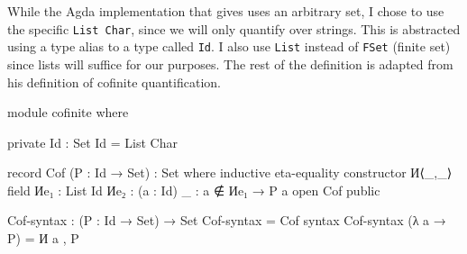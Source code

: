 While the Agda implementation that \citet{pitts_locally_2023} gives uses an arbitrary set, I chose
to use the specific \texttt{List Char}, since we will only quantify over strings. This is abstracted
using a type alias to a type called \texttt{Id}. I also use \texttt{List} instead of \texttt{FSet}
(finite set) since lists will suffice for our purposes. The rest of the definition is adapted from
his definition of cofinite quantification.
\begin{code}
module cofinite where
\end{code}
\begin{comment}
\begin{code}
  -- Data types (naturals, strings, characters)
  open import Data.Nat using (ℕ; zero; suc; _≤_; z≤n; s≤s)
  open import Data.Nat.Properties using (≤-refl; ≤-trans; ≤-antisym; ≤-total)
  open import Data.Char using (Char)
  open import Data.Char.Properties using () renaming (_≟_ to _≟char_)

  -- Relations and predicates/decidability.
  import Relation.Binary.PropositionalEquality as Eq
  open Eq using (_≡_; _≢_; refl; sym; trans; cong)
  open import Relation.Binary.Definitions using (DecidableEquality)
  open import Relation.Nullary.Decidable using (Dec)
  open import Relation.Unary using (Decidable)
  open import Relation.Binary using () renaming (Decidable to BinaryDecidable)
  open import Relation.Nullary.Negation using (contradiction)

  -- Lists.
  open import Data.List using (List; []; _∷_; _++_; length; filter; map; foldr; head; replicate)
  open import Data.List.Properties using (≡-dec)
  import Data.List.Membership.DecPropositional as DecPropMembership
  open import Data.List.Relation.Unary.All using (All; all?; lookup)
    renaming (fromList to All-fromList; toList to All-toList)
  open import Data.List.Relation.Unary.Any using (Any; here; there)
  open import Data.List.Extrema Data.Nat.Properties.≤-totalOrder using (max; xs≤max)

  -- Import list membership using List Char comparisons.
  private
    _≟lchar_ : ∀ (xs ys : List Char) → Dec (xs ≡ ys)
    xs ≟lchar ys = ≡-dec (_≟char_) xs ys

  open DecPropMembership _≟lchar_ using (_∈_; _∉_; _∈?_)
\end{code}
\end{comment}
\begin{code}
  private
    Id : Set
    Id = List Char

  record Cof (P : Id → Set) : Set where
    inductive
    eta-equality
    constructor И⟨_,_⟩
    field
      Иe₁ : List Id
      Иe₂ : (a : Id) {_ : a ∉ Иe₁} → P a
  open Cof public

  Cof-syntax : (P : Id → Set) → Set
  Cof-syntax = Cof
  syntax Cof-syntax (λ a → P) = И a , P
\end{code}
